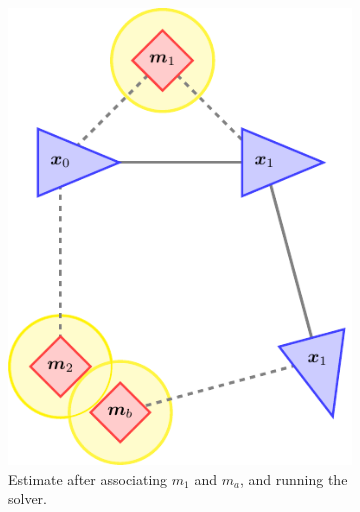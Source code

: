 \begin{figure}[htbp!]
\begin{subfigure}[htbp!]{0.25\textwidth}
        \includegraphics[width=\textwidth]{tikz/incremental2.pdf}
        \caption{Estimate after associating $m_1$ and $m_a$, and running the solver.}
    \end{subfigure}\hspace{2em}
    \begin{subfigure}[htbp!]{0.25\textwidth} 
        \centering

\end{subfigure}
\end{figure}
